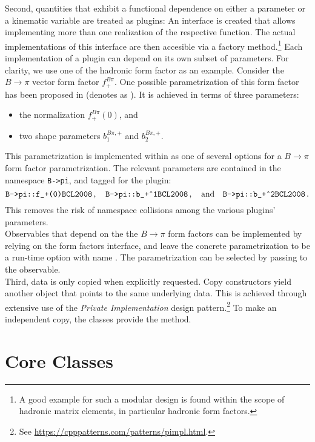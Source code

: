 Second, quantities that exhibit a functional dependence on either a parameter or
a kinematic variable are treated as plugins: An interface is created that
allows implementing more than one realization of the respective function.
The actual implementations of this interface are then accesible
via a factory method.\footnote{%
    A good example for such a modular design is found within the scope of
    hadronic matrix elements, in particular hadronic form factors.
}
Each implementation of a plugin can depend on its own subset of parameters. For
clarity, we use one of the hadronic form factor as an example.
Consider the $B\to \pi$ vector form factor $f^{B\pi}_+$. One possible
parametrization of this form factor has been proposed in \cite{Bourrely:2008za}
(denotes as ). It is achieved in terms of three parameters:
\begin{itemize}
    \item the normalization $f^{B\pi}_+(0)$, and
    \item two shape parameters $b^{B\pi,+}_1$ and $b^{B\pi,+}_2$.
\end{itemize}
This parametrization is implemented within \EOS as one of several options for
a $B\to \pi$ form factor parametrization.
The relevant \EOS parameters are contained in the
namespace \texttt{B->pi}, and tagged for the  plugin:
\begin{equation}
    \texttt{B->pi::f\_+(0)\@BCL2008}\,,\quad\texttt{B->pi::b\_+\^{}1\@BCL2008}\,,
    \quad\text{and}\quad\texttt{B->pi::b\_+\^{}2\@BCL2008}\,.
\end{equation}
This removes the risk of namespace collisions among the various plugins'
parameters.\\
Observables that depend on the the $B\to \pi$ form factors can be
implemented by relying on the form factors interface, and leave the concrete
parametrization to be a run-time option with name .  The
 parametrization can be selected by passing
 to the observable.\\


Third, data is only copied when explicitly requested. Copy constructors yield
another object that points to the same underlying data. This is achieved through
extensive use of the \emph{Private Implementation} design pattern.\footnote{%
    See \url{https://cpppatterns.com/patterns/pimpl.html}.
}
To make an independent copy, the \EOS classes provide the  method.


\section{Core Classes}
\label{sec:interface:classes}

